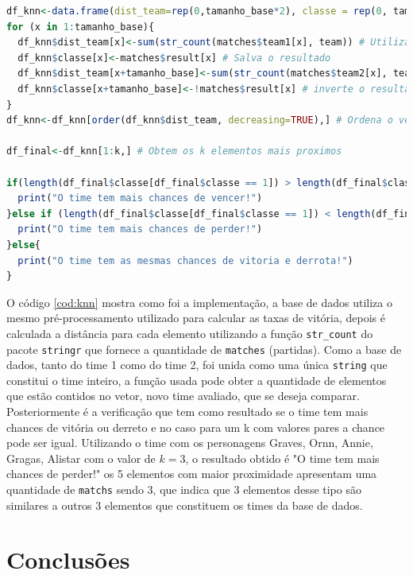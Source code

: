 \documentclass[a4paper]{article}
\begin{document}
\begin{lstlisting}[language=R, caption={Código para calcular a similaridade de um elemento com a base de dados},label={cod:knn}]
df_knn<-data.frame(dist_team=rep(0,tamanho_base*2), classe = rep(0, tamanho_base*2))
for (x in 1:tamanho_base){
  df_knn$dist_team[x]<-sum(str_count(matches$team1[x], team)) # Utiliza sim para contar a quantidade de matchs
  df_knn$classe[x]<-matches$result[x] # Salva o resultado
  df_knn$dist_team[x+tamanho_base]<-sum(str_count(matches$team2[x], team)) # faz a contagem para o time 2
  df_knn$classe[x+tamanho_base]<-!matches$result[x] # inverte o resultado
}
df_knn<-df_knn[order(df_knn$dist_team, decreasing=TRUE),] # Ordena o vetor para obter os mais proximos

df_final<-df_knn[1:k,] # Obtem os k elementos mais proximos

if(length(df_final$classe[df_final$classe == 1]) > length(df_final$classe[df_final$classe == 0])){
  print("O time tem mais chances de vencer!")
}else if (length(df_final$classe[df_final$classe == 1]) < length(df_final$classe[df_final$classe == 0])){
  print("O time tem mais chances de perder!")
}else{
  print("O time tem as mesmas chances de vitoria e derrota!")
}
\end{lstlisting}


O código \ref{cod:knn} mostra como foi a implementação, a base de dados utiliza o mesmo pré-processamento utilizado para calcular as taxas de vitória, depois é calculada a distância para cada elemento utilizando a função  \texttt{str\_count} do pacote \texttt{stringr} que fornece a quantidade de \texttt{matches} (partidas). Como a base de dados, tanto do time 1 como do time 2, foi unida como uma única \texttt{string} que constitui o time inteiro, a função usada pode obter a quantidade de elementos que estão contidos no vetor, novo time avaliado, que se deseja comparar. Posteriormente é a verificação que tem como resultado se o time tem mais chances de vitória ou derreto e no caso para um k com valores pares a chance pode ser igual.
Utilizando o time com os personagens Graves, Ornn, Annie, Gragas, Alistar com o valor de $k=3$, o resultado obtido é "O time tem mais chances de perder!" os 5 elementos com maior proximidade apresentam uma quantidade de \texttt{matchs} sendo 3, que indica que 3 elementos desse tipo são similares a outros 3 elementos que constituem os times da base de dados. 
\section{Conclusões}
\end{document}
